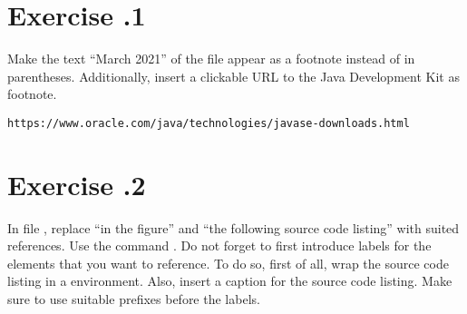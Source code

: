 \section*{Exercise \thechapter .1}
Make the text \enquote{March 2021} of the file 
 appear as a footnote instead of in 
parentheses. Additionally, insert a clickable URL to the Java Development Kit 
as footnote.

\texttt{https://www.oracle.com/java/technologies/javase-downloads.html}


\section*{Exercise \thechapter .2}
In file , replace \enquote{in the 
figure} and \enquote{the following source code listing} with suited references. 
Use the command . Do not forget to first 
introduce labels for the elements that you want to reference. To do so, first 
of all, wrap the source code listing in a  environment.
Also, insert a caption for the source code listing. 
Make sure to use suitable prefixes before the labels.


